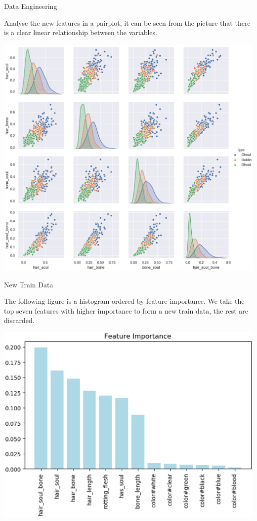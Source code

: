 \documentclass[
 size=14pt,
 paper=smartboard,  %
 mode=present, 		%
 display=slides, 	%
 style=tuliplab,  	%
 pauseslide,
 fleqn,leqno]{powerdot}
\begin{document}

\begin{slide}[toc=,bm=]{Data Engineering}

Analyse the new features in a pairplot, 
it can be seen from the picture that 
there is a clear linear relationship 
between the variables. 
	
	\begin{center}
		\includegraphics[width=.5\linewidth]{figures/hist_1.eps}
	\end{center}
	
\end{slide}


\begin{slide}[toc=,bm=]{New Train Data}
	
	The following figure is 
	a histogram ordered by 
	feature importance. 
	We take the top seven features 
	with higher importance 
	to form a new train data, 
	the rest are discarded.
	\begin{center}
		\includegraphics[scale=0.5]{figures/FEATURE.eps}
	\end{center}
	
\end{slide}
\end{document}
